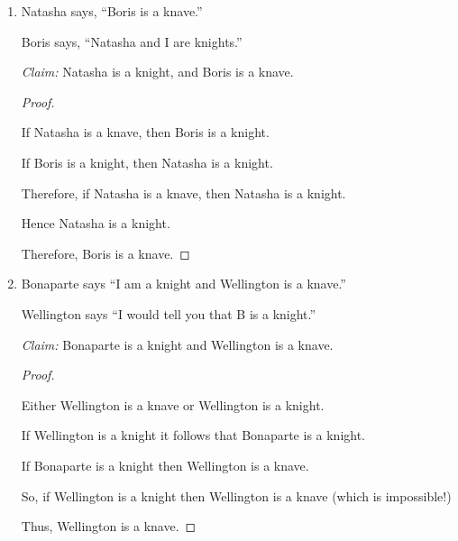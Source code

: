 \documentclass[10pt,]{book}
\theoremstyle{plain}
\theoremstyle{definition}
\theoremstyle{definition}
\numberwithin{equation}{section}
\begin{document}
\begin{enumerate}[label=(\alph*)]
\begin{enumerate}[label=\roman*.]
\item\hypertarget{li-164}{}
        Natasha says, ``Boris is a knave.'' 

        Boris says, ``Natasha and I are knights.''




        \emph{Claim:} Natasha is a knight, and Boris is a knave.

        \begin{proof}\hypertarget{proof-2}{}

            If Natasha is a knave, then Boris is a knight.
\par

            If Boris is a knight, then Natasha is a knight.
\par

            Therefore, if Natasha is a knave, then Natasha is a knight.
\par

            Hence Natasha is a knight.
\par

            Therefore, Boris is a knave.
\end{proof}


\item\hypertarget{li-165}{}
        Bonaparte says ``I am a knight and Wellington is a knave.''

        Wellington says ``I would tell you that B is a knight.''

        \emph{Claim:} Bonaparte is a knight and Wellington is a knave.

        \begin{proof}\hypertarget{proof-3}{}

            Either Wellington is a knave or Wellington is a knight.
\par

            If Wellington is a knight it follows that Bonaparte is a knight.
\par

            If Bonaparte is a knight then Wellington is a knave.
\par

            So, if Wellington is a knight then Wellington is a knave (which is impossible!)
\par

            Thus, Wellington is a knave.
\par


\end{proof}
\end{enumerate}
\end{enumerate}
\end{document}
